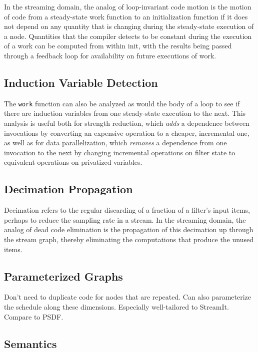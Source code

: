 In the streaming domain, the analog of loop-invariant code motion is
the motion of code from a steady-state work function to an
initialization function if it does not depend on any quantity that is
changing during the steady-state execution of a node.  Quantities that
the compiler detects to be constant during the execution of a work can
be computed from within init, with the results being passed through a
feedback loop for availability on future executions of work.

\subsection{Induction Variable Detection}

The {\tt work} function can also be analyzed as would the body of a loop
to see if there are induction variables from one steady-state execution
to the next.  This analysis is useful both for strength reduction, which
{\it adds} a dependence between invocations by converting an expensive
operation to a cheaper, incremental one, as well as for data
parallelization, which {\it removes} a dependence from one invocation to
the next by changing incremental operations on filter state to
equivalent operations on privatized variables.

\subsection{Decimation Propagation}

Decimation refers to the regular discarding of a fraction of a filter's
input items, perhaps to reduce the sampling rate in a stream.  In the
streaming domain, the analog of dead code elimination is the propagation
of this decimation up through the stream graph, thereby eliminating the
computations that produce the unused items.

\subsection{Parameterized Graphs}

Don't need to duplicate code for nodes that are repeated.  Can also
parameterize the schedule along these dimensions.  Especially
well-tailored to StreamIt.  Compare to PSDF.

\subsection{Semantics}


